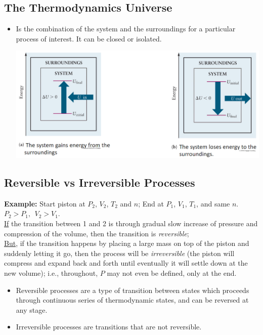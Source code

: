 \documentclass[10pt]{article}
\begin{document}
\subsection*{The Thermodynamics Universe}
\begin{itemize}
    \item Is the combination of the system and the surroundings for a particular process of interest.  It can be closed or isolated.
    \begin{center}
        \includegraphics*[scale=0.5]{W3_4.png}
    \end{center}
\end{itemize}

\subsection*{Reversible vs Irreversible Processes}
\textbf{Example:} Start piston at $P_2$, $V_2$, $T_2$ and $n$; End at $P_1$, $V_1$, $T_1$, and same $n$.  $P_2 > P_1,\:\: V_2 > V_1$.\\
\underline{If} the transition between 1 and 2 is through gradual slow increase of pressure and compression of the volume, then the transition is \textit{reversible};\\
\underline{But}, if the transition happens by placing a large mass on top of the piston and suddenly letting it go, then the process will be \textit{irreversible} (the piston will compress and expand back and forth until eventually it will settle down at the new volume); i.e., throughout, $P$ may not even be defined, only at the end.
\begin{itemize}
    \item Reversible processes are a type of transition between states which proceeds through continuous series of thermodynamic states, and can be reversed at any stage.
    \item Irreversible processes are transitions that are not reversible.
\end{itemize}
\end{document}
